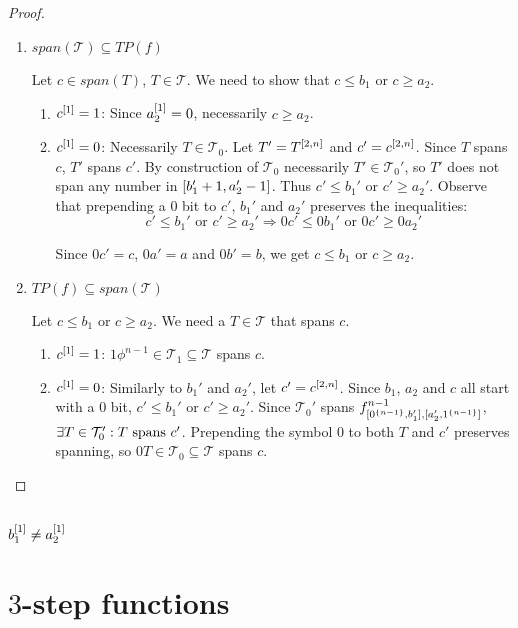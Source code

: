 \begin{proof}
\begin{enumerate}
\item{$span(\mathcal{T}) \subseteq TP(f)$}

Let $c \in span(T)$, $T \in \mathcal{T}$.
We need to show that $c \leq b_1$ or $c \geq a_2$.

\begin{enumerate}
\item $c^{[1]} = 1$: Since $a_2^{[1]} = 0$,
necessarily $c \geq a_2$.

\item $c^{[1]} = 0$: Necessarily $T \in \mathcal{T}_0$.
Let $T' = T^{[2, n]}$ and $c' = c^{[2, n]}$.
Since $T$ spans $c$, $T'$ spans $c'$.
By construction of $\mathcal{T}_0$
necessarily $T' \in \mathcal{T}_0'$,
so $T'$ does not span any number
in $[b_1' + 1, a_2' - 1]$.
Thus $c' \leq b_1'$ or $c' \geq a_2'$.
Observe that prepending a $0$ bit
to $c'$, $b_1'$ and $a_2'$
preserves the inequalities:
\[
c' \leq b_1' \text{ or } c' \geq a_2'
\Rightarrow
0 c' \leq 0 b_1' \text{ or } 0 c' \geq 0 a_2'
\]

Since $0 c' = c$, $0 a' = a$ and $0 b' = b$,
we get $c \leq b_1$ or $c \geq a_2$.
\end{enumerate}

\item{$TP(f) \subseteq span(\mathcal{T})$}

Let $c \leq b_1$ or $c \geq a_2$.
We need a $T \in \mathcal{T}$ that spans $c$.

\begin{enumerate}
\item $c^{[1]} = 1$:
$1 \phi^{n-1} \in \mathcal{T}_1 \subseteq \mathcal{T}$
spans $c$.

\item $c^{[1]} = 0$:
Similarly to $b_1'$ and $a_2'$, let $c' = c^{[2, n]}$.
Since $b_1$, $a_2$ and $c$ all start with a $0$ bit,
$c' \leq b_1'$ or $c' \geq a_2'$.
Since $\mathcal{T}_0'$ spans
$f^{n-1}_{[0^{\{n-1\}}, b_1'],
[a_2', 1^{\{n-1\}}]}$,
$\exists T \in \mathcal{T}_0' : T \text{ spans } c'$.
Prepending the symbol $0$ to both $T$ and $c'$
preserves spanning,
so $0 T \in \mathcal{T}_0 \subseteq \mathcal{T}$ spans $c$.
\end{enumerate}

\end{enumerate}
\end{proof}

\subsection{\texorpdfstring{$b_1^{[1]}
\neq a_2^{[1]}$}
{b1[1] != a2[1]}
}

\section{\texorpdfstring{$3$}{3}-step functions}

